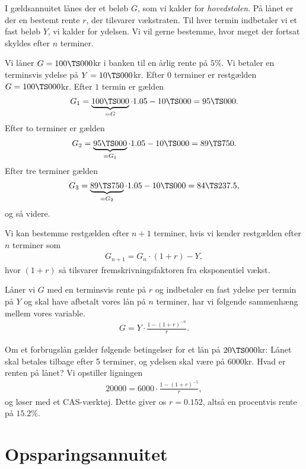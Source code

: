 I gældsannuitet lånes der et beløb $G$, som vi kalder for \textit{hovedstolen}. På lånet er der en bestemt rente $r$, der tilsvarer vækstraten. Til hver termin indbetaler vi et fast beløb $Y$, vi kalder for ydelsen. Vi vil gerne bestemme, hvor meget der fortsat skyldes efter $n$ terminer. 
\begin{exa}
Vi låner $G=100 \TS 000$kr i banken til en årlig rente på $5\%$. Vi betaler en terminsvis ydelse på $Y=10 \TS 000$kr.
Efter $0$ terminer er restgælden $G=100 \TS 000$kr. Efter $1$ termin er gælden
\begin{align*}
G_1 = \underbrace{100 \TS 000}_{=G}\cdot 1.05 - 10 \TS 000 = 95 \TS 000.
\end{align*}   
Efter to terminer er gælden 
\begin{align*}
G_2 = \underbrace{95 \TS 000}_{=G_1}\cdot 1.05-10 \TS 000 = 89 \TS 750.
\end{align*}
Efter tre terminer gælden 
\begin{align*}
G_3 = \underbrace{89 \TS 750}_{=G_2} \cdot 1.05 - 10 \TS 000 = 84 \TS 237.5,
\end{align*}
og så videre. 
\end{exa}
Vi kan bestemme restgælden efter $n+1$ terminer, hvis vi kender restgælden efter $n$ terminer som
\begin{align*}
G_{n+1} = G_{n}\cdot (1+r) - Y, 
\end{align*}
hvor $(1+r)$ så tilsvarer fremskrivningsfaktoren fra eksponentiel vækst. 
\begin{setn}
Låner vi $G$ med en terminsvis rente på $r$ og indbetaler en fast ydelse per termin på $Y$ og skal have afbetalt vores lån på $n$ terminer, har vi følgende sammenhæng mellem vores variable.
\begin{align*}
G = Y\cdot \frac{1-(1+r)^{-n}}{r}.
\end{align*}
\end{setn}
\begin{exa}
Om et forbrugslån gælder følgende betingelser for et lån på $20 \TS 000$kr: Lånet skal betales tilbage efter 5 terminer, og ydelsen skal være på 6000kr. Hvad er renten på lånet? Vi opstiller ligningen
\begin{align*}
20000 = 6000\cdot \frac{1-(1+r)^{-5}}{r},
\end{align*}
og løser med et CAS-værktøj. Dette giver os $r = 0.152$, altså en procentvis rente på $15.2\%$.
\end{exa}

\section*{Opsparingsannuitet}

